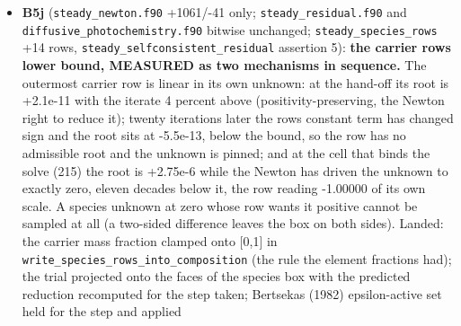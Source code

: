 \documentclass[english,a4paper]{my_memo}
\begin{document}
\begin{itemize}
  HYG-CHECKED corrected) and the four other keys the schema documented and
  the manual did not (\texttt{Reconstruction\ continuation}, \texttt{Atomic\ rate\ set},
  \texttt{Caloric\ EOS}, \texttt{Photoelectron\ heating}); MEASURED afterwards, all 97
  schema keys have a manual entry. Three stale manual entries corrected
  (\texttt{Resid\ norm} is retired; \texttt{Resid\ tol}\textquotesingle s norm is the row scaling of
  sections 143/145, not \texttt{\textbar{}R\textbar{}/max\textbar{}u\textbar{}}; \texttt{Flux\ spread\ tol} default 2e-5, not
  5e-3); the validity paragraph\textquotesingle s "one of three" made four. The \texttt{\_adv}
  validity conditions live in ONE place (manual section 4,
  \texttt{\textbackslash{}label\{sec:advvalidity\}}), the HOWTO points there; the HOWTO names
  \texttt{exhale\_io.py} as the loader every new script should use (four \texttt{\#\ columns} parsers exist). Advisor: the same three stale statements in
  \texttt{parameters.f90}\textquotesingle s comments corrected (default 1e-5; the row scaling; the
  retired base valve), and the four schema rows whose code spans carried a
  \texttt{\textbar{}} (a strict renderer split them) rewritten; table widths verified.
\item
  \textbf{B5j} (\texttt{steady\_newton.f90} +1061/-41 only; \texttt{steady\_residual.f90} and
  \texttt{diffusive\_photochemistry.f90} bitwise unchanged; \texttt{steady\_species\_rows}
  +14 rows, \texttt{steady\_selfconsistent\_residual} assertion 5): \textbf{the carrier
  row\textquotesingle s lower bound, MEASURED as two mechanisms in sequence.} The
  outermost carrier row is linear in its own unknown: at the hand-off its
  root is +2.1e-11 with the iterate 4 percent above (positivity-preserving,
  the Newton right to reduce it); twenty iterations later the row\textquotesingle s
  constant term has changed sign and the root sits at -5.5e-13, below the
  bound, so the row has no admissible root and the unknown is pinned; and
  at the cell that binds the solve (215) the root is +2.75e-6 while the
  Newton has driven the unknown to exactly zero, eleven decades below it,
  the row reading -1.00000 of its own scale. A species unknown at zero
  whose row wants it positive cannot be sampled at all (a two-sided
  difference leaves the box on both sides). Landed: the carrier mass
  fraction clamped onto {[}0,1{]} in \texttt{write\_species\_rows\_into\_composition} (the
  rule the element fractions had); the trial projected onto the faces of
  the species box with the predicted reduction recomputed for the step
  taken; Bertsekas (1982) epsilon-active set held for the step and applied

\end{itemize}
\end{document}
